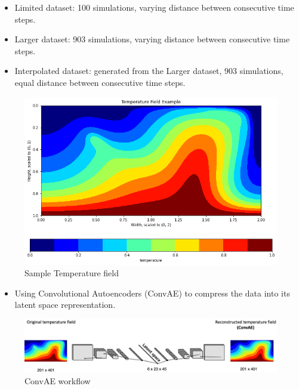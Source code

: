 {\begin{itemize}
        \begin{itemize}
            
            \item Limited dataset: 100 simulations, varying distance between consecutive time steps.
            
	    \item Larger dataset: 903 simulations,           varying distance between consecutive          time steps.
     
            \item Interpolated dataset: generated from the Larger dataset, 903 simulations, equal distance between consecutive time steps.
        \end{itemize}
\end{itemize}

\begin{figure}[H]
    \centering
    \includegraphics[width=0.5\linewidth]{figures/temperature_field_example.png}
    \caption{Sample Temperature field}
\end{figure}   

\begin{itemize}   
    
    \item Using Convolutional Autoencoders (ConvAE) to compress the data into its latent space representation.
\end{itemize}

\begin{figure}[H]
    \centering
    \includegraphics[width=0.8\linewidth]{figures/ConvAE_workflow.png}
    \caption{ConvAE workflow}
\end{figure}
}



